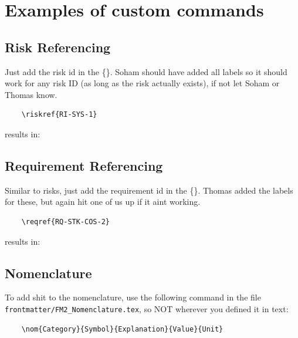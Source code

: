 \documentclass[../main.tex]{subfiles}
\begin{document}
\section{Examples of custom commands}

\subsection{Risk Referencing}
Just add the risk id in the \{\}. Soham should have added all labels so it should work for any risk ID (as long as the risk actually exists), if not let Soham or Thomas know.

\begin{verbatim}
    \riskref{RI-SYS-1}
\end{verbatim}

results in: 

\subsection{Requirement Referencing}

Similar to risks, just add the requirement id in the \{\}. Thomas added the labels for these, but again hit one of us up if it aint working.

\begin{verbatim}
    \reqref{RQ-STK-COS-2}
\end{verbatim}

results in: 

\subsection{Nomenclature}

To add shit to the nomenclature, use the following command in the file \texttt{frontmatter/FM2\_Nomenclature.tex}, so NOT wherever you defined it in text:

\begin{verbatim}
    \nom{Category}{Symbol}{Explanation}{Value}{Unit}
\end{verbatim}
\end{document}
